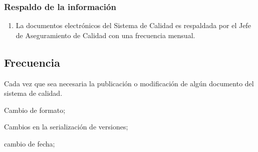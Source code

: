 \subsubsection{Respaldo de la información}
\begin{enumerate}
	\item La documentos electrónicos del Sistema de Calidad es respaldada por el Jefe de Aseguramiento de Calidad con una frecuencia mensual.
\end{enumerate}

\subsection{Frecuencia}
Cada vez que sea necesaria la publicación o modificación de algún documento del sistema de calidad.

\begin{changelog}[simple, sectioncmd=\subsection*,label=changelog-\thesection-\MayorVer.\MenorVer5]
	\begin{version}[v=\MayorVer.\MenorVer, date=2023--01, author=Pablo E. Alanis]
		\item Cambio de formato;
		\item Cambios en la serialización de versiones;
	\end{version}

	\begin{version}[v=1.6, date=2022--05, author=Alonso M.]
		\item cambio de fecha;
	\end{version}

\end{changelog}
